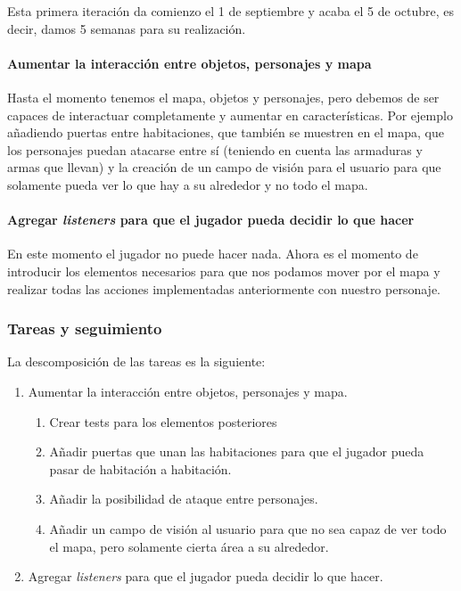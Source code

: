Esta primera iteración da comienzo el 1 de septiembre y acaba el 5 de octubre, es decir, damos 5 semanas para su realización.

\paragraph{Aumentar la interacción entre objetos, personajes y mapa} Hasta el momento tenemos el mapa, objetos y personajes, pero debemos de ser capaces de interactuar completamente y aumentar en características. Por ejemplo añadiendo puertas entre habitaciones, que también se muestren en el mapa, que los personajes puedan atacarse entre sí (teniendo en cuenta las armaduras y armas que llevan) y la creación de un campo de visión para el usuario para que solamente pueda ver lo que hay a su alrededor y no todo el mapa.

\paragraph{Agregar \textit{listeners} para que el jugador pueda decidir lo que hacer} En este momento el jugador no puede hacer nada. Ahora es el momento de introducir los elementos necesarios para que nos podamos mover por el mapa y realizar todas las acciones implementadas anteriormente con nuestro personaje.

\subsubsection{Tareas y seguimiento}

La descomposición de las tareas es la siguiente:

\begin{enumerate}[label=\bfseries WBS 1.\arabic*]
  \item Aumentar la interacción entre objetos, personajes y mapa.
    \begin{enumerate}[label=\bfseries WBS 1.1.\arabic*]
      \item Crear tests para los elementos posteriores
      \item Añadir puertas que unan las habitaciones para que el jugador pueda pasar de habitación a habitación.
      \item Añadir la posibilidad de ataque entre personajes.
      \item Añadir un campo de visión al usuario para que no sea capaz de ver todo el mapa, pero solamente cierta área a su alrededor.
    \end{enumerate}
  \item Agregar \textit{listeners} para que el jugador pueda decidir lo que hacer.
\end{enumerate}

